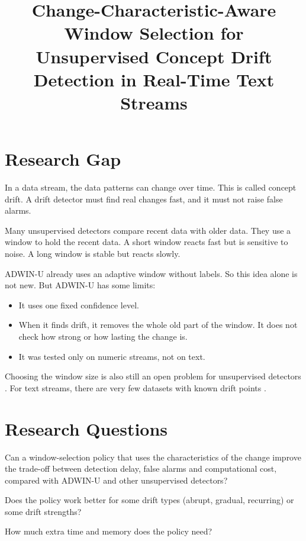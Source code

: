\documentclass[11pt,a4paper]{article}
\title{Change-Characteristic-Aware Window Selection for\\
Unsupervised Concept Drift Detection in Real-Time Text Streams}
\author{}
\date{}
\begin{document}
\maketitle

\section{Research Gap}

In a data stream, the data patterns can change over time. This is called concept drift. A drift detector must find real changes fast, and it must not raise false alarms.

Many unsupervised detectors compare recent data with older data. They use a window to hold the recent data. A short window reacts fast but is sensitive to noise. A long window is stable but reacts slowly.

ADWIN-U \cite{assis2025} already uses an adaptive window without labels. So this idea alone is not new. But ADWIN-U has some limits:
\begin{itemize}
\item It uses one fixed confidence level.
\item When it finds drift, it removes the whole old part of the window. It does not check how strong or how lasting the change is.
\item It was tested only on numeric streams, not on text.
\end{itemize}

Choosing the window size is also still an open problem for unsupervised detectors \cite{lukats2025}. For text streams, there are very few datasets with known drift points \cite{garcia2024}.

\section{Research Questions}

\begin{description}[leftmargin=0pt,style=nextline]
\item[RQ1 (main).] Can a window-selection policy that uses the characteristics of the change improve the trade-off between detection delay, false alarms and computational cost, compared with ADWIN-U and other unsupervised detectors?
\item[RQ2.] Does the policy work better for some drift types (abrupt, gradual, recurring) or some drift strengths?
\item[RQ3.] How much extra time and memory does the policy need?
\end{description}
\end{document}
